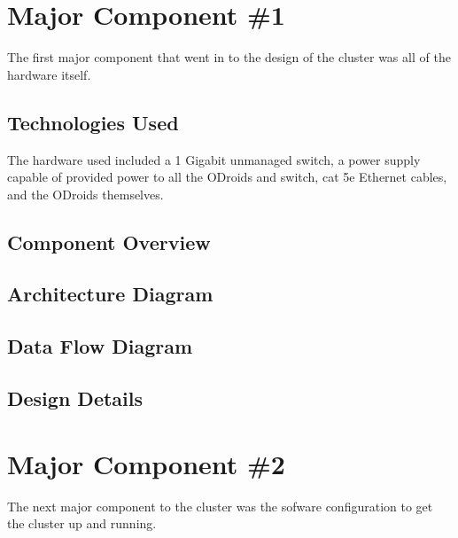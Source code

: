 \section{Major Component \#1 }

The first major component that went in to the design of the cluster was all of the hardware itself. 

\subsection{Technologies  Used}

The hardware used included a 1 Gigabit unmanaged switch, a power supply capable of provided power to all the ODroids and switch, cat 5e Ethernet cables, and the ODroids themselves. 

\subsection{Component  Overview}



\subsection{ Architecture  Diagram}


\subsection{Data Flow Diagram}


\subsection{Design Details}

\section{Major Component \#2 }

The next major component to the cluster was the sofware configuration to get the cluster up and running.

